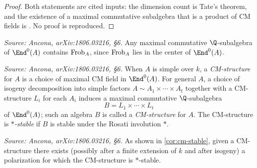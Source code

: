 \begin{proof}
  Both statements are cited inputs: the dimension count is Tate's theorem, and
  the existence of a maximal commutative subalgebra that is a product of CM
  fields is \cite[Lemma 2]{TateBour}. No proof is reproduced.
\end{proof}

\begin{remark}
  \label{rem:frob}
  \textit{Source: Ancona, arXiv:1806.03216, §6.}
  Any maximal commutative \(\Q\)-subalgebra of \(\End^0(A)\) contains
  \(\mathrm{Frob}_A\), since \(\mathrm{Frob}_A\) lies in the center of \(\End^0(A)\).
\end{remark}

\begin{definition}[CM-structure]
  \label{def:CM-structure}
  \textit{Source: Ancona, arXiv:1806.03216, §6.}
  When \(A\) is simple over \(k\), a \emph{CM-structure} for \(A\) is a choice of
  maximal CM field in \(\End^0(A)\). For general \(A\), a choice of isogeny
  decomposition into simple factors \(A \sim A_1 \times \cdots \times A_t\)
  together with a CM-structure \(L_i\) for each \(A_i\) induces a maximal
  commutative \(\Q\)-subalgebra
  \[B = L_1 \times \cdots \times L_t\]
  of \(\End^0(A)\); such an algebra \(B\) is called a \emph{CM-structure} for
  \(A\). The CM-structure is \emph{\(*\)-stable} if \(B\) is stable under the
  Rosati involution \(*\).
\end{definition}

\begin{remark}
  \label{rem:cm-stable-exists}
  \textit{Source: Ancona, arXiv:1806.03216, §6.}
  As shown in \cref{cor:cm-stable}, given a CM-structure there exists (possibly
  after a finite extension of \(k\) and after isogeny) a polarization for which
  the CM-structure is \(*\)-stable.
\end{remark}

